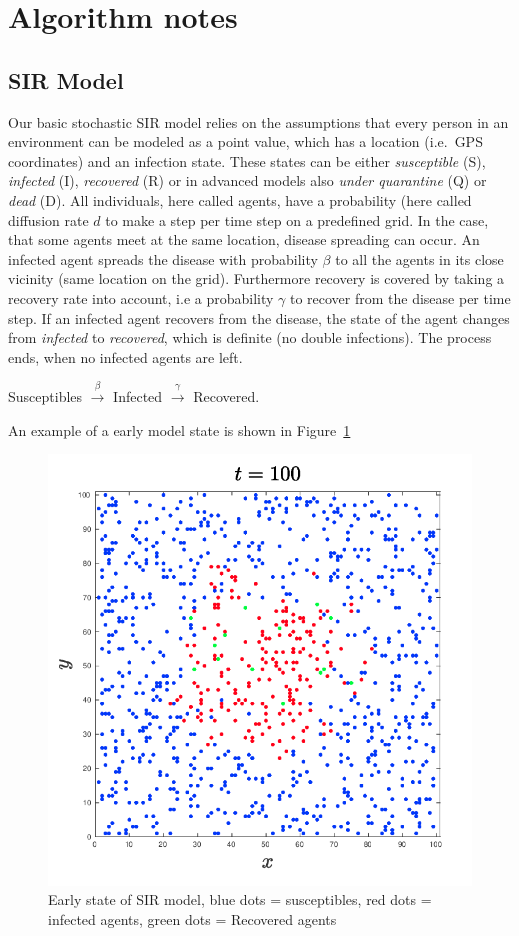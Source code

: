 
\section{Algorithm notes}

\subsection{SIR Model}
Our basic stochastic SIR model relies on the assumptions that every person in an environment can be modeled as a point value, which has a location (i.e.\ GPS coordinates) and an infection state. These states can be either \textit{susceptible} (S), \textit{infected} (I), \textit{recovered} (R) or in advanced models also \textit{under quarantine} (Q) or \textit{dead} (D). All individuals, here called agents, have a probability (here called diffusion rate $d$ to make a step per time step on a predefined grid. In the case, that some agents meet at the same location, disease spreading can occur. An infected agent spreads the disease with probability $\beta$ to all the agents in its close vicinity (same location on the grid). Furthermore recovery is covered by taking a recovery rate into account, i.e a probability $\gamma$ to recover from the disease per time step. If an infected agent recovers from the disease, the state of the agent changes from \textit{infected} to \textit{recovered}, which is definite (no double infections). The process ends, when no infected agents are left.
\begin{center}
    Susceptibles $\overset{\beta}{\longrightarrow}$ Infected $\overset{\gamma}{\longrightarrow}$ Recovered.
\end{center}

An example of a early model state is shown in Figure~\ref{fig:1}
\begin{figure}[H]
    \centering
    \includegraphics[width=0.4\linewidth]{initial_setup.png}
    \caption{Early state of SIR model, blue dots = susceptibles, red dots = infected agents, green dots = Recovered agents}%
    \label{fig:1}
\end{figure}

